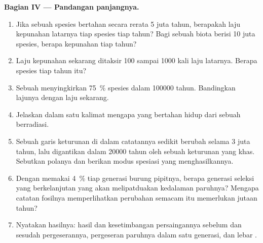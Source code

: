 \begin{problem}
\medskip
\noindent\textbf{Bagian IV --- Pandangan panjangnya.}
\begin{enumerate}[resume]
  \item Jika sebuah spesies bertahan secara rerata 5 juta tahun,
        berapakah laju kepunahan latarnya tiap spesies tiap tahun? Bagi
        sebuah biota berisi 10 juta spesies, berapa kepunahan tiap
        tahun?
  \item Laju kepunahan sekarang ditaksir 100 sampai 1000 kali laju
        latarnya. Berapa spesies tiap tahun itu?
  \item Sebuah  menyingkirkan \qty{75}{\%} spesies
        dalam \num{100000} tahun. Bandingkan lajunya dengan laju
        sekarang.
  \item Jelaskan dalam satu kalimat mengapa yang bertahan hidup dari
        sebuah  berradiasi.
  \item Sebuah garis keturunan di dalam catatannya sedikit berubah
        selama 3 juta tahun, lalu digantikan dalam \num{20000} tahun
        oleh sebuah keturunan yang khas. Sebutkan polanya dan berikan
        modus spesiasi yang menghasilkannya.
  \item Dengan memakai \qty{4}{\%} tiap generasi burung pipitnya,
        berapa generasi seleksi yang berkelanjutan yang akan
        melipatduakan kedalaman paruhnya? Mengapa catatan fosilnya
        memperlihatkan perubahan semacam itu memerlukan jutaan tahun?
  \item Nyatakan hasilnya: hasil dan kesetimbangan persaingannya
        sebelum dan sesudah pergeserannya, pergeseran paruhnya dalam
        satu generasi, dan lebar .
\end{enumerate}
\end{problem}
